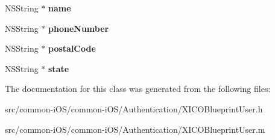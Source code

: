 \begin{DoxyCompactItemize}
N\+S\+String $\ast$ {\bfseries name}
\item 
\hypertarget{interface_x_i_c_o_blueprint_user_a064b60c5d1389153701ba3a3225b89a4}{}\label{interface_x_i_c_o_blueprint_user_a064b60c5d1389153701ba3a3225b89a4} 
N\+S\+String $\ast$ {\bfseries phone\+Number}
\item 
\hypertarget{interface_x_i_c_o_blueprint_user_a5765037b9b52472ef14c8f33bc453cf4}{}\label{interface_x_i_c_o_blueprint_user_a5765037b9b52472ef14c8f33bc453cf4} 
N\+S\+String $\ast$ {\bfseries postal\+Code}
\item 
\hypertarget{interface_x_i_c_o_blueprint_user_a9fff46320b89c47990d889172f0e2e15}{}\label{interface_x_i_c_o_blueprint_user_a9fff46320b89c47990d889172f0e2e15} 
N\+S\+String $\ast$ {\bfseries state}
\end{DoxyCompactItemize}


The documentation for this class was generated from the following files\+:\begin{DoxyCompactItemize}
\item 
src/common-\/i\+O\+S/common-\/i\+O\+S/\+Authentication/X\+I\+C\+O\+Blueprint\+User.\+h\item 
src/common-\/i\+O\+S/common-\/i\+O\+S/\+Authentication/X\+I\+C\+O\+Blueprint\+User.\+m\end{DoxyCompactItemize}
